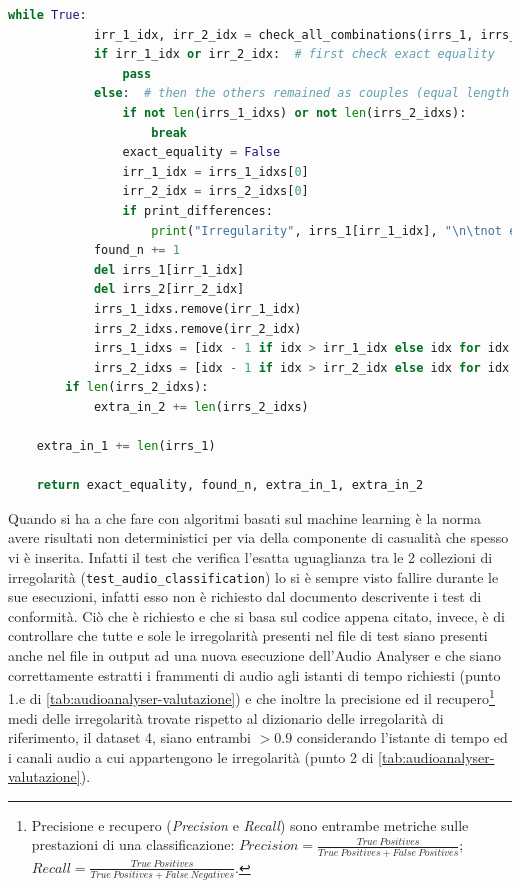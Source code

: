 \begin{lstlisting}[language=Python, caption=Codice che testa la costanza dei risultati della classificazione in Audio Analyser]
        while True:
            irr_1_idx, irr_2_idx = check_all_combinations(irrs_1, irrs_1_idxs, irrs_2, irrs_2_idxs)
            if irr_1_idx or irr_2_idx:  # first check exact equality
                pass
            else:  # then the others remained as couples (equal length already checked)
                if not len(irrs_1_idxs) or not len(irrs_2_idxs):
                    break
                exact_equality = False
                irr_1_idx = irrs_1_idxs[0]
                irr_2_idx = irrs_2_idxs[0]
                if print_differences:
                    print("Irregularity", irrs_1[irr_1_idx], "\n\tnot exactly equal to\n\t", irrs_2[irr_2_idx])
            found_n += 1
            del irrs_1[irr_1_idx]
            del irrs_2[irr_2_idx]
            irrs_1_idxs.remove(irr_1_idx)
            irrs_2_idxs.remove(irr_2_idx)
            irrs_1_idxs = [idx - 1 if idx > irr_1_idx else idx for idx in irrs_1_idxs]
            irrs_2_idxs = [idx - 1 if idx > irr_2_idx else idx for idx in irrs_2_idxs]
        if len(irrs_2_idxs):
            extra_in_2 += len(irrs_2_idxs)

    extra_in_1 += len(irrs_1)

    return exact_equality, found_n, extra_in_1, extra_in_2
\end{lstlisting}

Quando si ha a che fare con algoritmi basati sul machine learning è la norma avere risultati non deterministici per via della componente di casualità che spesso vi è inserita.
Infatti il test che verifica l'esatta uguaglianza tra le 2 collezioni di irregolarità (\verb|test_audio_classification|) lo si è sempre visto fallire durante le sue esecuzioni, infatti esso non è richiesto dal documento descrivente i test di conformità.
Ciò che è richiesto e che si basa sul codice appena citato, invece, è di controllare che tutte e sole le irregolarità presenti nel file di test siano presenti anche nel file in output ad una nuova esecuzione dell'Audio Analyser e che siano correttamente estratti i frammenti di audio agli istanti di tempo richiesti (punto 1.e di \ref{tab:audioanalyser-valutazione}) e che inoltre la precisione ed il recupero\footnote{Precisione e recupero (\textit{Precision} e \textit{Recall}) sono entrambe metriche sulle prestazioni di una classificazione: $Precision=\frac{True\ Positives}{True\ Positives + False\ Positives}$; $Recall=\frac{True\ Positives}{True\ Positives + False\ Negatives}$.} medi delle irregolarità trovate rispetto al dizionario delle irregolarità di riferimento, il dataset 4, siano entrambi $>0.9$ considerando l'istante di tempo ed i canali audio a cui appartengono le irregolarità (punto 2 di \ref{tab:audioanalyser-valutazione}).


